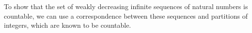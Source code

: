 \documentclass[letterpaper,12pt]{article}
\begin{document}





To show that the set of weakly decreasing infinite sequences of natural numbers is countable, we can use a correspondence between these sequences and partitions of integers, which are known to be countable.
\end{document}
